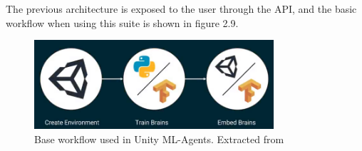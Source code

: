 The previous architecture is exposed to the user through the API, and the basic workflow when using
this suite is shown in figure 2.9.

\begin{figure}[!ht]
    \centering
    \includegraphics[width=3.5in]{./chapters/imgs/img_unity_mlagents_workflow.png}
    \caption[unity ml agents workflow]{Base workflow used in Unity ML-Agents. Extracted from \citet{unity-ml-agents}}
    \label{fig:unity-ml-agents-workflow}
\end{figure}